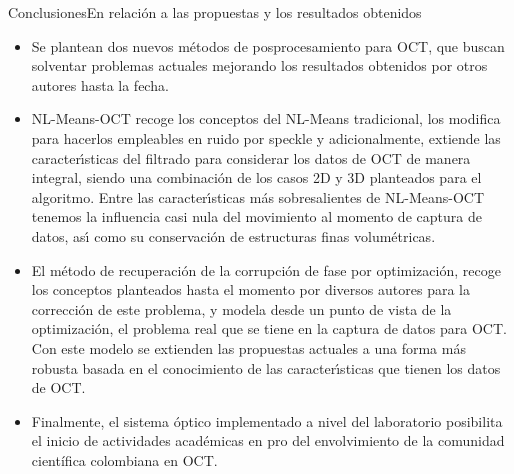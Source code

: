 \documentclass[fleqn,10pt]{beamer}
\begin{document}
\begin{frame}{Conclusiones}{En relación a las propuestas y los resultados obtenidos}
	
		{\footnotesize \begin{itemize}
			\item<1->  Se plantean {\color{green}dos nuevos métodos de posprocesamiento} para OCT, que buscan solventar problemas actuales mejorando los
			resultados obtenidos por otros autores hasta la fecha.
			
			
			\item<2-> NL-Means-OCT recoge los conceptos del NL-Means tradicional, los modifica para	hacerlos empleables en ruido por speckle y adicionalmente, {\color{blue}extiende las caracterı́sticas del filtrado} para considerar los datos de OCT de manera integral, siendo una combinación de los casos 2D y 3D planteados para el algoritmo. Entre las caracterı́sticas más sobresalientes de NL-Means-OCT tenemos la {\color{teal}influencia casi nula del movimiento} al momento de captura de datos, ası́ como su {\color{violet}conservación de estructuras finas volumétricas}.
			
			\item<3-> El método de recuperación de la corrupción de fase por optimización, recoge los conceptos planteados hasta el momento por diversos autores para la corrección de este problema, y {\color{cyan}modela desde un punto de vista de la optimización}, el problema real que se tiene en la captura de datos para OCT. Con este modelo se extienden las propuestas actuales a una forma más robusta basada en el conocimiento de las caracterı́sticas que tienen los datos de OCT.
			
			\item<4-> Finalmente, el sistema óptico implementado a nivel del laboratorio posibilita  {\color{red}el inicio de actividades académicas} en pro del envolvimiento de la comunidad científica colombiana en OCT.
		\end{itemize}}
	

\end{frame}
\end{document}
